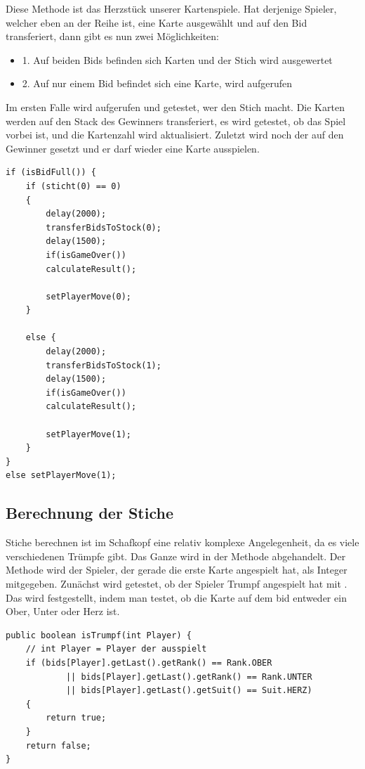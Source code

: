 Diese Methode ist das Herzstück unserer Kartenspiele. Hat derjenige Spieler,
welcher eben an der Reihe ist, eine Karte ausgewählt und auf den Bid
transferiert, dann gibt es nun zwei Möglichkeiten:

\begin{itemize}
	\item 1. Auf beiden Bids befinden sich Karten und der Stich wird ausgewertet
	\item 2. Auf nur einem Bid befindet sich eine Karte,  wird 		 aufgerufen
\end{itemize}

Im ersten Falle wird  aufgerufen und getestet, wer den Stich
macht. Die Karten werden auf den Stack des Gewinners transferiert, es wird
getestet, ob das Spiel vorbei ist, und die Kartenzahl wird aktualisiert.
Zuletzt wird noch der  auf den Gewinner gesetzt und er darf
wieder eine Karte ausspielen.

\begin{lstlisting}[caption={initPlayers gamecycle},captionpos=b]
if (isBidFull()) {
    if (sticht(0) == 0)
    {
        delay(2000);
        transferBidsToStock(0);
        delay(1500);
        if(isGameOver())
        calculateResult();

        setPlayerMove(0);
    }

    else {
        delay(2000);
        transferBidsToStock(1);
        delay(1500);
        if(isGameOver())
        calculateResult();

        setPlayerMove(1);
    }
}
else setPlayerMove(1);
\end{lstlisting}

\subsection{Berechnung der Stiche}

Stiche berechnen ist im Schafkopf eine relativ komplexe Angelegenheit, da es
viele verschiedenen Trümpfe gibt. Das Ganze wird in der Methode
 abgehandelt. Der Methode wird der Spieler, der gerade
die erste Karte angespielt hat, als Integer mitgegeben. Zunächst wird getestet,
ob der Spieler Trumpf angespielt hat mit . Das wird
festgestellt, indem man testet, ob die Karte auf dem bid entweder ein Ober,
Unter oder Herz ist.

\begin{lstlisting}[caption={isTrumpf Methode},captionpos=b]
public boolean isTrumpf(int Player) {
    // int Player = Player der ausspielt
    if (bids[Player].getLast().getRank() == Rank.OBER
            || bids[Player].getLast().getRank() == Rank.UNTER
            || bids[Player].getLast().getSuit() == Suit.HERZ)
    {
        return true;
    }
    return false;
}
\end{lstlisting}

